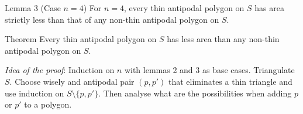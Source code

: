 \documentclass{beamer}
\begin{document}
\begin{frame}
\begin{alertblock}{Lemma 3 (Case $n=4$)}
For $n = 4$, every thin antipodal polygon on $S$ has area strictly less than
that of any non-thin antipodal polygon on $S$.
\end{alertblock}\pause

\begin{alertblock}{Theorem}
Every thin antipodal polygon on $S$ has less area than any non-thin antipodal
polygon on $S$.
\end{alertblock}\pause
\vspace{0.5cm}

\emph{Idea of the proof}: Induction on $n$ with lemmas 2 and 3 as base cases. Triangulate $S$. Choose wisely and antipodal pair $(p,p')$ that eliminates a thin triangle and use induction on $S\setminus\{p,p'\}$. Then analyse what are the possibilities when adding $p$ or $p'$ to a polygon.
\end{frame}
\end{document}

